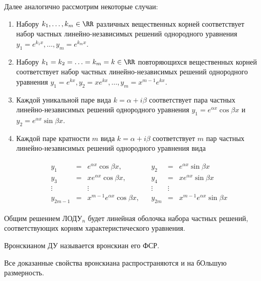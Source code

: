 Далее аналогично рассмотрим некоторые случаи:
\begin{enumerate}
  \item Набору \(k_{1}, \dotsc, k_{m} \in \RR\) различных вещественных корней
  соответствует набор частных линейно-независимых решений однородного уравнения
  \(y_{1} = e^{k_{1} x}, \dotsc, y_{m} = e^{k_{m} x}\).

  \item Набору \(k_{1} = k_{2} = \dotsc = k_{m} = k \in \RR\) повторяющихся
  вещественных корней соответствует набор частных линейно-независимых решений
  однородного уравнения \(
    y_{1} = e^{k x}, y_{2} = x e^{k x},
    \dotsc,
    y_{m} = x^{m - 1} e^{k x}
  \).

  \item Каждой уникальной паре вида \(k = \alpha + i \beta\) соответствует пара
  частных линейно-независимых решений однородного уравнения
  \(y_{1} = e^{\alpha x} \cos \beta x\) и
  \(y_{2} = e^{\alpha x} \sin \beta x\).
  
  \item Каждой паре кратности \(m\) вида \(k = \alpha + i \beta\) соответствует
  \(m\) пар частных линейно-независимых решений однородного уравнения вида
  
  \begin{align*}
    \begin{matrix}
      y_{1} & = & e^{\alpha x} \cos \beta x, &&
        y_{2} & = & e^{\alpha x} \sin \beta x \\
      y_{3} & = & x e^{\alpha x} \cos \beta x, &&
        y_{4} & = & x e^{\alpha x} \sin \beta x \\
      \vdots && \vdots && \vdots & \vdots \\
      y_{2m - 1} & = & x^{m - 1} e^{\alpha x} \cos \beta x, &&
      y_{2m} & = & x^{m - 1} e^{\alpha x} \sin \beta x  
    \end{matrix}
  \end{align*}
\end{enumerate}

\begin{remark}
  Общим решением ЛОДУ\(_n\) будет линейная оболочка набора частных решений,
  соответствующих корням характеристического уравнения.
\end{remark}

\begin{definition}
  Вронскианом ДУ называется вронскиан его ФСР.
\end{definition}

\begin{remark}
  Все доказанные свойства вронскиана распространяются и на бОльшую размерность.
\end{remark}
